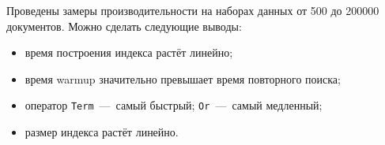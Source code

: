 \documentclass{itmo}
\begin{document}
Проведены замеры производительности на наборах данных от 500 до 200000 документов.
Можно сделать следующие выводы:
\begin{itemize}
	\item время построения индекса растёт линейно;
	\item время warmup значительно превышает время повторного поиска;
	\item оператор \texttt{Term}~---~самый быстрый; \texttt{Or}~---~самый медленный;
	\item размер индекса растёт линейно.
\end{itemize}
\end{document}
